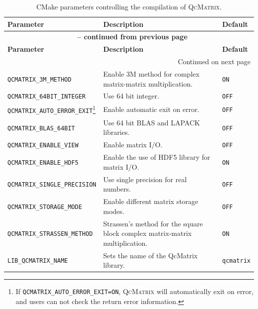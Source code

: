 \documentclass[a4paper,11pt,twoside,openright]{book}
\begin{document}
\begin{center}
  \begin{longtable}{l|p{}|l}
    \caption{CMake parameters controlling the compilation of \textsc{QcMatrix}.}
    \label{tab-cmake-parameters}\\
    \hline\hline
    \textbf{Parameter} & \textbf{Description} & \textbf{Default}\\
    \hline
    \endfirsthead
    \multicolumn{3}{c}{{\bfseries \tablename\ \thetable{} -- continued from previous page}}\\
    \hline\hline
    \textbf{Parameter} & \textbf{Description} & \textbf{Default}\\
    \hline
    \endhead
    \hline
    \multicolumn{3}{r}{Continued on next page}\\
    \hline
    \endfoot
    \hline\hline
    \endlastfoot
%
    \verb|QCMATRIX_3M_METHOD| & Enable 3M method for complex matrix-matrix multiplication. & \verb|ON|\\
    \verb|QCMATRIX_64BIT_INTEGER| & Use 64 bit integer. & \verb|OFF|\\
    \verb|QCMATRIX_AUTO_ERROR_EXIT|\footnote{If \texttt{QCMATRIX\_AUTO\_ERROR\_EXIT=ON},
                                            \textsc{QcMatrix} will automatically exit on error,
                                            and users can not check the return error information.} %
      & Enable automatic exit on error. & \verb|OFF|\\
    \verb|QCMATRIX_BLAS_64BIT| & Use 64 bit BLAS and LAPACK libraries. & \verb|OFF|\\
    \verb|QCMATRIX_ENABLE_VIEW| & Enable matrix I/O. & \verb|OFF|\\
    \verb|QCMATRIX_ENABLE_HDF5|  & Enable the use of HDF5 library for matrix I/O. & \verb|ON|\\
    \verb|QCMATRIX_SINGLE_PRECISION| & Use single precision for real numbers. & \verb|OFF|\\
    \verb|QCMATRIX_STORAGE_MODE| & Enable different matrix storage modes. & \verb|OFF|\\
    \verb|QCMATRIX_STRASSEN_METHOD| %
      & Strassen's method for the square block complex matrix-matrix multiplication. & \verb|ON|\\
    \verb|LIB_QCMATRIX_NAME| & Sets the name of the QcMatrix library. & \verb|qcmatrix|\\

\end{longtable}
\end{center}
\end{document}
